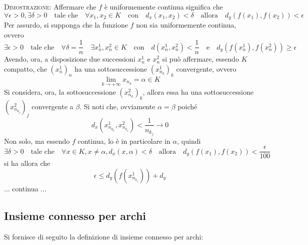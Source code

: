 \documentclass[a4paper]{extarticle}
\begin{document}
\vspace{2em}
\noindent
\normalfont \normalsize
\textsc{Dimostrazione}: Affermare che $f$ è uniformemente continua significa che
\[\forall \epsilon > 0, \exists \delta > 0 \hspace{1em} \text{tale che} \hspace{1em} \forall x_1,x_2 \in K \hspace{1em} \text{con} \hspace{1em} d_x(x_1,x_2) < \delta \hspace{1em} \text{allora} \hspace{1em} d_y(f(x_1),f(x_2)) < \epsilon\]
Per assurdo, si supponga che la funzione $f$ non sia uniformemente continua, ovvero
\[\exists \epsilon > 0 \hspace{1em} \text{tale che} \hspace{1em} \forall \delta = \frac{1}{n} \hspace{1em} \exists x^1_n,x^2_n \in K \hspace{1em} \text{con} \hspace{1em} d(x^1_n,x^2_n) < \frac{1}{n} \hspace{1em} \text{e} \hspace{1em} d_y(f(x^1_n),f(x^2_n)) \geq \epsilon\]
Avendo, ora, a disposizione due successioni $x^1_n$ e $x^2_n$ si può affermare, essendo $K$ compatto, che $(x^1_n)_n$ ha una sottosuccessione $(x^1_{n_k})_{k}$ convergente, ovvero
\[\lim_{k \to +\infty} x_{n_{k}} = \alpha \in K\]
Si considera, ora, la sottosuccessione $(x^2_{n_k})_k$, allora essa ha una sottosuccessione $(x^2_{n_{k_j}})_j$ convergente a $\beta$. Si noti che, ovviamente $\alpha = \beta$ poiché
\[d_x(x^1_{n_{k_k}},x^2_{n_{k_j}}) < \frac{1}{n_{k_j}} \to 0\]
Non solo, ma essendo $f$ continua, lo è in particolare in $\alpha$, quindi
\[\exists \delta > 0 \hspace{1em} \text{tale che} \hspace{1em} \forall x \in K, x \neq \alpha, d_x(x,\alpha) < \delta \hspace{1em} \text{allora} \hspace{1em} d_y(f(x_1),f(x_2)) < \frac{\epsilon}{100}\]
si ha allora che
\[\epsilon \leq d_y(f(x^1_{n_{k_j}})) + d_y\]
... continua ...

\vspace{1em}
\noindent
\subsection{Insieme connesso per archi}
Si fornisce di seguito la definizione di insieme connesso per archi:
\end{document}
